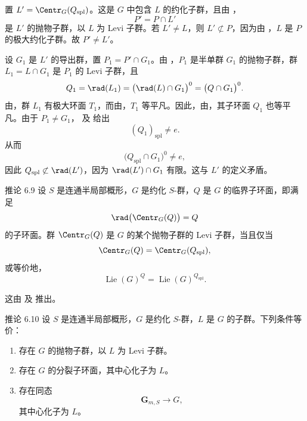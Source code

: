 置 \(L'=\Centr_G(Q_{\mathrm{spl}})\)。这是 \(G\) 中包含 \(L\) 的约化子群，且由 ，
\[
 P'=P\cap L'
\]
是 \(L'\) 的抛物子群，以 \(L\) 为 Levi 子群。若 \(L'\ne L\)，则 \(L'\not\subset P\)，因为由 ，\(L\) 是 \(P\) 的极大约化子群。故 \(P'\ne L'\)。

设 \(G_1\) 是 \(L'\) 的导出群，置 \(P_1=P'\cap G_1\)。由 ，\(P_1\) 是半单群 \(G_1\) 的抛物子群，群 \(L_1=L\cap G_1\) 是 \(P_1\) 的 Levi 子群，且
\[
 Q_1=\rad(L_1)
    =\bigl(\rad(L)\cap G_1\bigr)^0
    =\bigl(Q\cap G_1\bigr)^0.
\]
由，群 \(L_1\) 有极大环面 \(T_1\)，而由，\(T_1\) 等平凡。因此，由，其子环面 \(Q_1\) 也等平凡。由于 \(P_1\ne G_1\)， 及  给出
\[
 (Q_1)_{\mathrm{spl}}\ne e.
\]
从而
\[
 \bigl(Q_{\mathrm{spl}}\cap G_1\bigr)^0\ne e,
\]
因此 \(Q_{\mathrm{spl}}\not\subset\rad(L')\)，因为 \(\rad(L')\cap G_1\) 有限。这与 \(L'\) 的定义矛盾。
\SGAQED


\begin{sgastatement}{推论 6.9}
设 \(S\) 是连通半局部概形，\(G\) 是约化 \(S\)-群，\(Q\) 是 \(G\) 的临界子环面，即满足
\[
 \rad\bigl(\Centr_G(Q)\bigr)=Q
\]
的子环面。群 \(\Centr_G(Q)\) 是 \(G\) 的某个抛物子群的 Levi 子群，当且仅当
\[
 \Centr_G(Q)=\Centr_G(Q_{\mathrm{spl}}),
\]
或等价地，
\[
 \operatorname{Lie}(G)^Q
   =\operatorname{Lie}(G)^{Q_{\mathrm{spl}}}.
\]
\end{sgastatement}

这由  及  推出。

\begin{sgastatement}{推论 6.10}
设 \(S\) 是连通半局部概形，\(G\) 是约化 \(S\)-群，\(L\) 是 \(G\) 的子群。下列条件等价：
\begin{enumerate}[label=\textup{(\roman*)}]
\item 存在 \(G\) 的抛物子群，以 \(L\) 为 Levi 子群。
\item 存在 \(G\) 的分裂子环面，其中心化子为 \(L\)。
\item 存在同态
\[
 \mathbf G_{m,S}\longrightarrow G,
\]
其中心化子为 \(L\)。
\end{enumerate}
\end{sgastatement}

